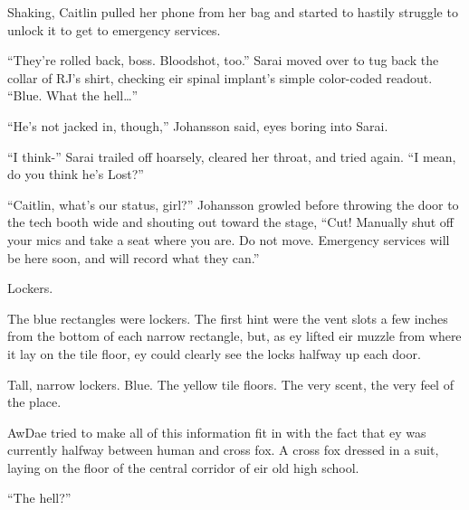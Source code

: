 Shaking, Caitlin pulled her phone from her bag and started to hastily struggle to unlock it to get to emergency services.

``They're rolled back, boss.  Bloodshot, too.''  Sarai moved over to tug back the collar of RJ's shirt, checking eir spinal implant's simple color-coded readout.  ``Blue.  What the hell\ldots{}''

``He's not jacked in, though,'' Johansson said, eyes boring into Sarai.

``I think-'' Sarai trailed off hoarsely, cleared her throat, and tried again.  ``I mean, do you think he's Lost?''

``Caitlin, what's our status, girl?''  Johansson growled before throwing the door to the tech booth wide and shouting out toward the stage, ``Cut!  Manually shut off your mics and take a seat where you are.  Do not move.  Emergency services will be here soon, and will record what they can.''

\secdiv

Lockers.

The blue rectangles were lockers.  The first hint were the vent slots a few inches from the bottom of each narrow rectangle, but, as ey lifted eir muzzle from where it lay on the tile floor, ey could clearly see the locks halfway up each door.

Tall, narrow lockers.  Blue.  The yellow tile floors.  The very scent, the very feel of the place.

AwDae tried to make all of this information fit in with the fact that ey was currently halfway between human and cross fox.  A cross fox dressed in a suit, laying on the floor of the central corridor of eir old high school.

``The hell?''
